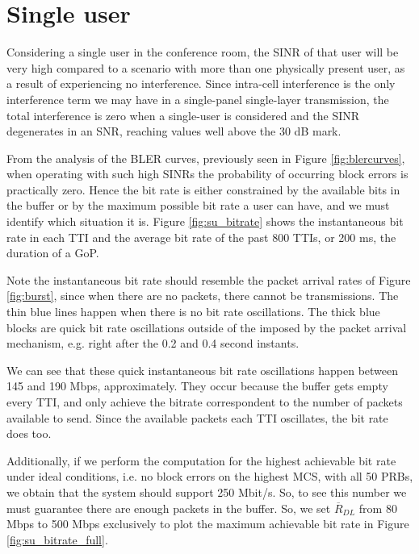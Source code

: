 \section{Single user} \label{sec:single-user}

Considering a single user in the conference room, the SINR of that user will be very high compared to a scenario with more than one physically present user, as a result of experiencing no interference. Since intra-cell interference is the only interference term we may have in a single-panel single-layer transmission, the total interference is zero when a single-user is considered and the SINR degenerates in an SNR, reaching values well above the 30 dB mark.

From the analysis of the BLER curves, previously seen in Figure \ref{fig:blercurves}, when operating with such high SINRs the probability of occurring block errors is practically zero. Hence the bit rate is either constrained by the available bits in the buffer or by the maximum possible bit rate a user can have, and we must identify which situation it is. Figure \ref{fig:su_bitrate} shows the instantaneous bit rate in each TTI and the average bit rate of the past 800 TTIs, or 200 ms, the duration of a \ac{GoP}.


Note the instantaneous bit rate should resemble the packet arrival rates of Figure \ref{fig:burst}, since when there are no packets, there cannot be transmissions. The thin blue lines happen when there is no bit rate oscillations. The thick blue blocks are quick bit rate oscillations outside of the imposed by the packet arrival mechanism, e.g. right after the 0.2 and 0.4 second instants. 

We can see that these quick instantaneous bit rate oscillations happen between 145 and 190 Mbps, approximately. They occur because the buffer gets empty every TTI, and only achieve the bitrate correspondent to the number of packets available to send. Since the available packets each TTI oscillates, the bit rate does too. 

Additionally, if we perform the computation for the highest achievable bit rate under ideal conditions, i.e. no block errors on the highest \acs{MCS}, with all 50 \acsp{PRB}, we obtain that the system should support 250 Mbit/s. So, to see this number we must guarantee there are enough packets in the buffer. So, we set $\overline{R}_{DL}$ from 80 Mbps to 500 Mbps exclusively to plot the maximum achievable bit rate in Figure \ref{fig:su_bitrate_full}. 


